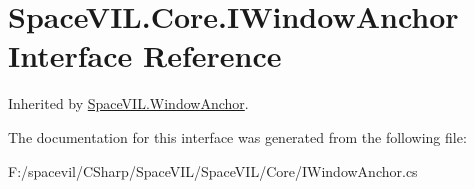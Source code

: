 \hypertarget{interface_space_v_i_l_1_1_core_1_1_i_window_anchor}{}\section{Space\+V\+I\+L.\+Core.\+I\+Window\+Anchor Interface Reference}
\label{interface_space_v_i_l_1_1_core_1_1_i_window_anchor}


Inherited by \mbox{\hyperlink{class_space_v_i_l_1_1_window_anchor}{Space\+V\+I\+L.\+Window\+Anchor}}.



The documentation for this interface was generated from the following file\+:\begin{DoxyCompactItemize}
\item 
F\+:/spacevil/\+C\+Sharp/\+Space\+V\+I\+L/\+Space\+V\+I\+L/\+Core/I\+Window\+Anchor.\+cs\end{DoxyCompactItemize}
